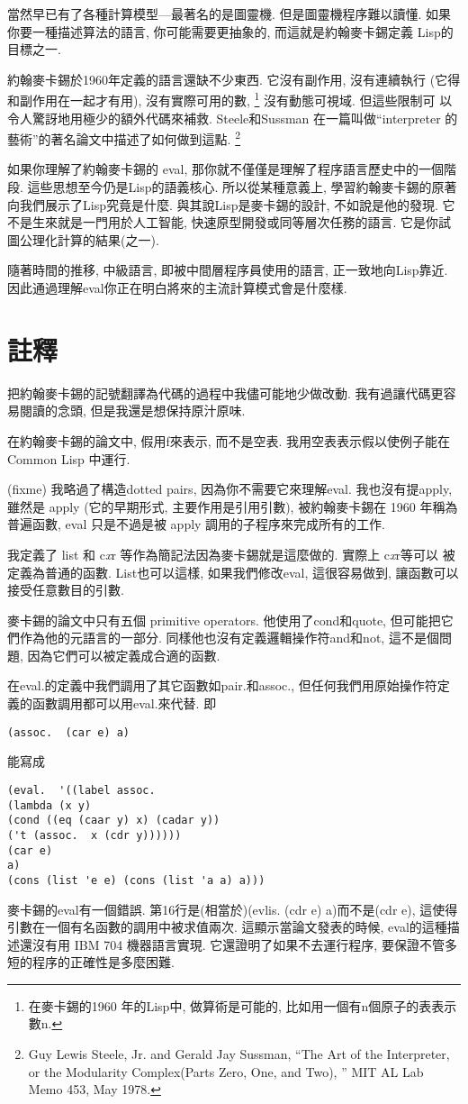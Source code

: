 \documentclass[12pt]{article}
\begin{document}
\begin{CJK}{UTF8}{bsmi}
當然早已有了各種計算模型---最著名的是圖靈機. 
但是圖靈機程序難以讀懂. 
如果你要一種描述算法的語言, 
你可能需要更抽象的, 
而這就是約翰麥卡錫定義 
Lisp的目標之一. 

約翰麥卡錫於1960年定義的語言還缺不少東西. 
它沒有副作用, 
沒有連續執行 
(它得和副作用在一起才有用), 
沒有實際可用的數, \footnote{在麥卡錫的1960 
年的Lisp中, 
做算術是可能的, 
比如用一個有n個原子的表表示數n.} 
沒有動態可視域. 
但這些限制可 
以令人驚訝地用極少的額外代碼來補救. 
Steele和Sussman
在一篇叫做``interpreter 的藝術''的著名論文中描述了如何做到這點.
\footnote{Guy Lewis Steele, Jr.  and Gerald Jay Sussman,
``The Art of the Interpreter, or the Modularity Complex(Parts Zero, One, and Two), '' 
MIT AL Lab Memo 453, May 1978.} 

如果你理解了約翰麥卡錫的 eval, 
那你就不僅僅是理解了程序語言歷史中的一個階段. 
這些思想至今仍是Lisp的語義核心. 
所以從某種意義上, 
學習約翰麥卡錫的原著向我們展示了Lisp究竟是什麼. 
與其說Lisp是麥卡錫的設計, 不如說是他的發現. 
它不是生來就是一門用於人工智能, 
快速原型開發或同等層次任務的語言. 
它是你試圖公理化計算的結果(之一). 

隨著時間的推移, 
中級語言, 
即被中間層程序員使用的語言, 
正一致地向Lisp靠近. 
因此通過理解eval你正在明白將來的主流計算模式會是什麼樣. 
\section{註釋} 
把約翰麥卡錫的記號翻譯為代碼的過程中我儘可能地少做改動. 
我有過讓代碼更容易閱讀的念頭, 
但是我還是想保持原汁原味. 

在約翰麥卡錫的論文中, 假用f來表示, 
而不是空表. 
我用空表表示假以使例子能在
Common Lisp 中運行. 

(fixme) 
我略過了構造dotted 
pairs, 
因為你不需要它來理解eval. 
我也沒有提apply, 
雖然是 apply (它的早期形式, 主要作用是引用引數), 被約翰麥卡錫在 1960 年稱為普遍函數, 
eval 只是不過是被 apply 調用的子程序來完成所有的工作. 

我定義了 list 和 c{\it x}r 等作為簡記法因為麥卡錫就是這麼做的. 
實際上 c{\it x}r等可以 被定義為普通的函數.  List也可以這樣, 如果我們修改eval, 
這很容易做到, 讓函數可以接受任意數目的引數.  

麥卡錫的論文中只有五個 primitive operators. 
他使用了cond和quote, 但可能把它們作為他的元語言的一部分. 
同樣他也沒有定義邏輯操作符and和not, 
這不是個問題, 
因為它們可以被定義成合適的函數. 

在eval.的定義中我們調用了其它函數如pair.和assoc.,
但任何我們用原始操作符定義的函數調用都可以用eval.來代替. 
即 
\begin{verbatim} 
(assoc.  (car e) a) 
\end{verbatim} 
能寫成 
\begin{verbatim} 
(eval.  '((label assoc. 
(lambda (x y) 
(cond ((eq (caar y) x) (cadar y)) 
('t (assoc.  x (cdr y)))))) 
(car e) 
a) 
(cons (list 'e e) (cons (list 'a a) a))) 
\end{verbatim} 
麥卡錫的eval有一個錯誤. 
第16行是(相當於)(evlis.  (cdr e) a)而不是(cdr e), 
這使得引數在一個有名函數的調用中被求值兩次. 
這顯示當論文發表的時候, 
eval的這種描述還沒有用 IBM 704 機器語言實現. 
它還證明了如果不去運行程序, 
要保證不管多短的程序的正確性是多麼困難. 


\end{CJK}
\end{document}
